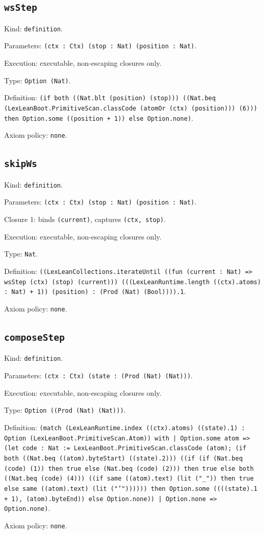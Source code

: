 \documentclass[11pt]{article}
\begin{document}
\subsection*{\texttt{wsStep}}
\noindent Kind: \texttt{definition}.\par
\noindent Parameters: \texttt{(ctx : Ctx) (stop : Nat) (position : Nat)}.\par
\noindent Execution: executable, non-escaping closures only.\par
\noindent Type: \texttt{Option (Nat)}.\par
\noindent Definition: \texttt{(if both ((Nat.blt (position) (stop))) ((Nat.beq (LexLeanBoot.PrimitiveScan.classCode (atomOr (ctx) (position))) (6))) then Option.some ((position + 1)) else Option.none)}.\par
\noindent Axiom policy: \texttt{none}.\par
\subsection*{\texttt{skipWs}}
\noindent Kind: \texttt{definition}.\par
\noindent Parameters: \texttt{(ctx : Ctx) (stop : Nat) (position : Nat)}.\par
\noindent Closure 1: binds \texttt{(current)}, captures \texttt{(ctx, stop)}.\par
\noindent Execution: executable, non-escaping closures only.\par
\noindent Type: \texttt{Nat}.\par
\noindent Definition: \texttt{((LexLeanCollections.iterateUntil ((fun (current : Nat) => wsStep (ctx) (stop) (current))) (((LexLeanRuntime.length ((ctx).atoms) : Nat) + 1)) (position) : (Prod (Nat) (Bool)))).1}.\par
\noindent Axiom policy: \texttt{none}.\par
\subsection*{\texttt{composeStep}}
\noindent Kind: \texttt{definition}.\par
\noindent Parameters: \texttt{(ctx : Ctx) (state : (Prod (Nat) (Nat)))}.\par
\noindent Execution: executable, non-escaping closures only.\par
\noindent Type: \texttt{Option ((Prod (Nat) (Nat)))}.\par
\noindent Definition: \texttt{(match (LexLeanRuntime.index ((ctx).atoms) ((state).1) : Option (LexLeanBoot.PrimitiveScan.Atom)) with | Option.some atom => (let code : Nat := LexLeanBoot.PrimitiveScan.classCode (atom); (if both ((Nat.beq ((atom).byteStart) ((state).2))) ((if (if (Nat.beq (code) (1)) then true else (Nat.beq (code) (2))) then true else both ((Nat.beq (code) (4))) ((if same ((atom).text) (lit ("\_")) then true else same ((atom).text) (lit ("'")))))) then Option.some ((((state).1 + 1), (atom).byteEnd)) else Option.none)) | Option.none => Option.none)}.\par
\noindent Axiom policy: \texttt{none}.\par
\end{document}
